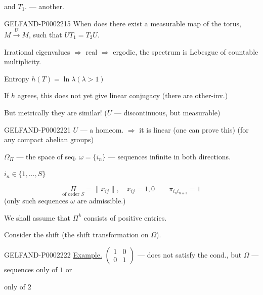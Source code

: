 and $T_1$. — another.

\begin{GelfandAdjacentEvidence}{GELFAND-P000221}{5}
When does there exist a measurable map of the torus, $M\overset{U}{\longrightarrow}M$,
such that $UT_1=T_2U$.
\end{GelfandAdjacentEvidence}

Irrational eigenvalues $\Rightarrow$ real $\Rightarrow$ ergodic, the spectrum
is Lebesgue of countable multiplicity.



Entropy $h (T)=\ln\lambda$\quad $(\lambda>1)$





If $h$ agrees, this does not yet give linear conjugacy (there are other-inv.)

But metrically they are similar! ($U$ — discontinuous, but measurable)

\begin{GelfandAdjacentEvidence}{GELFAND-P000222}{1}
$U$ — a homeom. $\Longrightarrow$ it is linear (one can prove this)
(for any compact abelian groups)
\end{GelfandAdjacentEvidence}

$\Omega_\Pi$ — the space of seq. $\omega=\{i_n\}$ — sequences infinite in both directions.

$i_n\in\{1,\ldots, S\}$



\begin{equation*}
 \underset{\text{of order }S}{\Pi}=\|x_{ij}\|,\quad x_{ij}=1,0
 \qquad \pi_{i_n i_{n+1}}=1
\end{equation*}
(only such sequences $\omega$ are admissible.)



We shall assume that $\Pi^k$ consists of positive entries.

Consider the shift (the shift transformation on $\Omega$).



\begin{GelfandAdjacentEvidence}{GELFAND-P000222}{2}
\underline{Example.}\quad
$\begin{pmatrix}1&0\\0&1\end{pmatrix}$ — does not satisfy the cond., but $\Omega$ — sequences
only of $1$ or 
\end{GelfandAdjacentEvidence}
 only of $2$



